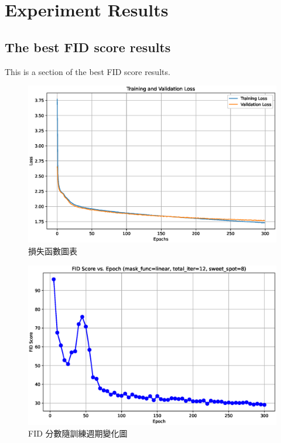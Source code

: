 \clearpage
\section{Experiment Results}

\subsection{The best FID score results}
This is a section of the best FID score results.

\begin{figure}[h]
    \centering
    \includegraphics[width=\textwidth]{figures/loss_plot.eps}
    \caption{損失函數圖表}
    \label{fig:loss_plot}
\end{figure}

\begin{figure}[h]
    \centering
    \includegraphics[width=\textwidth]{figures/fid_vs_epoch.eps}
    \caption{FID 分數隨訓練週期變化圖}
    \label{fig:fid_vs_epoch}
\end{figure}


